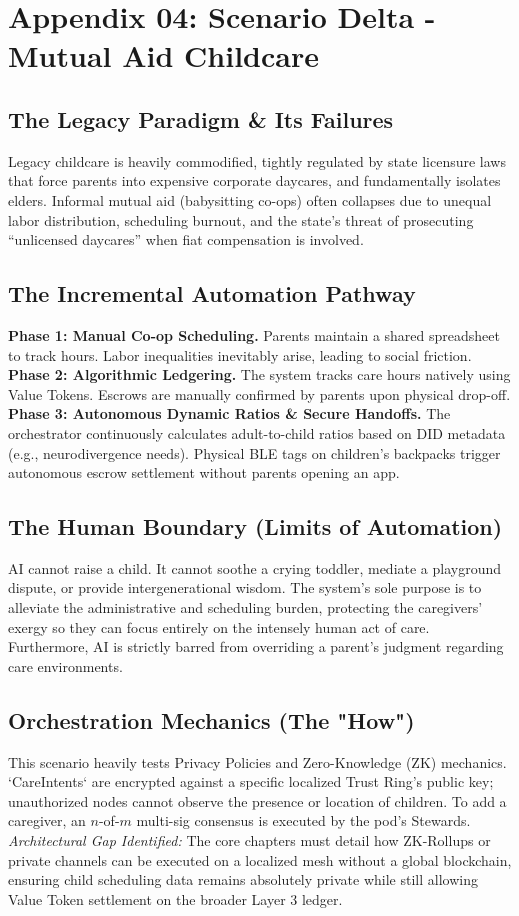 \chapter{Appendix 04: Scenario Delta - Mutual Aid Childcare}

\section{The Legacy Paradigm \& Its Failures}
Legacy childcare is heavily commodified, tightly regulated by state licensure laws that force parents into expensive corporate daycares, and fundamentally isolates elders. Informal mutual aid (babysitting co-ops) often collapses due to unequal labor distribution, scheduling burnout, and the state's threat of prosecuting ``unlicensed daycares'' when fiat compensation is involved.

\section{The Incremental Automation Pathway}
\textbf{Phase 1: Manual Co-op Scheduling.} Parents maintain a shared spreadsheet to track hours. Labor inequalities inevitably arise, leading to social friction. \\
\textbf{Phase 2: Algorithmic Ledgering.} The system tracks care hours natively using Value Tokens. Escrows are manually confirmed by parents upon physical drop-off. \\
\textbf{Phase 3: Autonomous Dynamic Ratios \& Secure Handoffs.} The orchestrator continuously calculates adult-to-child ratios based on DID metadata (e.g., neurodivergence needs). Physical BLE tags on children's backpacks trigger autonomous escrow settlement without parents opening an app.

\section{The Human Boundary (Limits of Automation)}
AI cannot raise a child. It cannot soothe a crying toddler, mediate a playground dispute, or provide intergenerational wisdom. The system's sole purpose is to alleviate the administrative and scheduling burden, protecting the caregivers' exergy so they can focus entirely on the intensely human act of care. Furthermore, AI is strictly barred from overriding a parent's judgment regarding care environments.

\section{Orchestration Mechanics (The "How")}
This scenario heavily tests Privacy Policies and Zero-Knowledge (ZK) mechanics. `CareIntents` are encrypted against a specific localized Trust Ring's public key; unauthorized nodes cannot observe the presence or location of children. To add a caregiver, an $n$-of-$m$ multi-sig consensus is executed by the pod's Stewards.
\textit{Architectural Gap Identified:} The core chapters must detail how ZK-Rollups or private channels can be executed on a localized mesh without a global blockchain, ensuring child scheduling data remains absolutely private while still allowing Value Token settlement on the broader Layer 3 ledger.

